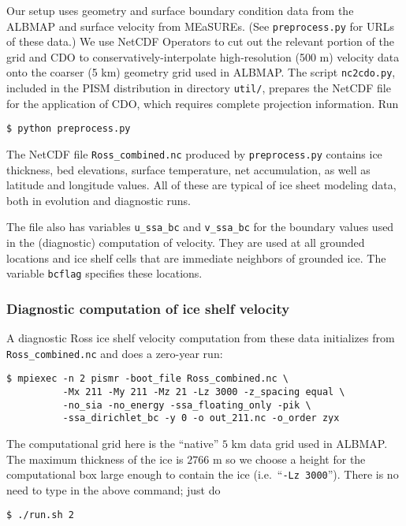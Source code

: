 Our setup uses geometry and surface boundary condition data from the ALBMAP and surface velocity from MEaSUREs.  (See \texttt{preprocess.py} for URLs of these data.)  We use NetCDF Operators to cut out the relevant portion of the grid and CDO to conservatively-interpolate high-resolution (500 m) velocity data onto the coarser (5 km) geometry grid used in ALBMAP.  The script \texttt{nc2cdo.py}, included in the PISM distribution in directory \texttt{util/}, prepares the NetCDF file for the application of CDO, which requires complete projection information.  Run

\begin{verbatim}
$ python preprocess.py
\end{verbatim}%

The NetCDF file \texttt{Ross_combined.nc} produced by \texttt{preprocess.py} contains ice thickness, bed elevations, surface temperature, net accumulation, as well as latitude and longitude values.  All of these are typical of ice sheet modeling data, both in evolution and diagnostic runs.

The file also has variables \texttt{u_ssa_bc} and \texttt{v_ssa_bc} for the boundary values used in the (diagnostic) computation of velocity.  They are used at all grounded locations and ice shelf cells that are immediate neighbors of grounded ice.  The variable \texttt{bcflag} specifies these locations.


\subsubsection*{Diagnostic computation of ice shelf velocity}
A diagnostic Ross ice shelf velocity computation from these data initializes from \texttt{Ross_combined.nc} and does a zero-year run:

\begin{verbatim}
$ mpiexec -n 2 pismr -boot_file Ross_combined.nc \
          -Mx 211 -My 211 -Mz 21 -Lz 3000 -z_spacing equal \
          -no_sia -no_energy -ssa_floating_only -pik \
          -ssa_dirichlet_bc -y 0 -o out_211.nc -o_order zyx
\end{verbatim}%
The computational grid here is the ``native'' $5$ km data grid used in ALBMAP.  The maximum thickness of the ice is $2766$ m so we choose a height for the computational box large enough to contain the ice (i.e.~``\texttt{-Lz 3000}'').  There is no need to type in the above command; just do

\begin{verbatim}
$ ./run.sh 2
\end{verbatim}%

